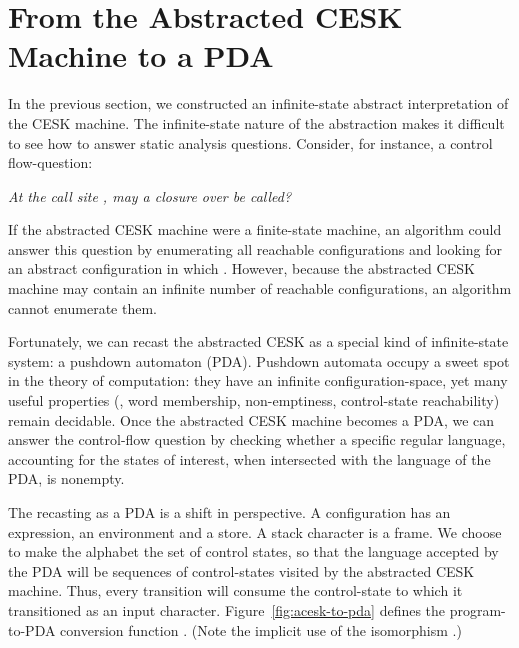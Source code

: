 \section{From the Abstracted CESK Machine
  to a PDA}
\label{sec:pda}
In the previous section, we constructed an infinite-state abstract
interpretation of the CESK machine.
The infinite-state nature of the abstraction makes it difficult to see how
to answer static analysis questions.
Consider, for instance, a control flow-question:
\begin{center}
\emph{  At the call site , may a closure over
   be called?}
\end{center}
If the abstracted CESK machine were a finite-state machine, an
algorithm could answer this question by enumerating all reachable
configurations and looking for an abstract configuration
 in which
.
However, because the abstracted CESK machine may contain an infinite
number of reachable configurations, an algorithm cannot enumerate
them.


Fortunately, we can recast the abstracted CESK as a special kind of
infinite-state system: a pushdown automaton (PDA).
Pushdown automata occupy a sweet spot in the theory of computation:
they have an infinite configuration-space, yet many useful properties
(\eg, word membership, non-emptiness, control-state reachability)
remain decidable.
Once the abstracted CESK machine becomes a PDA, we can answer the
control-flow question by checking whether a specific regular language,
accounting for the states of interest, when intersected with the
language of the PDA, is nonempty.

The recasting as a PDA is a shift in perspective.
A configuration has an expression, an environment and a store. 
A stack character is a frame.
We choose to make the alphabet the set of control states, so that the
language accepted by the PDA will be sequences of control-states
visited by the abstracted CESK machine.
Thus, every transition will consume the control-state to which it
transitioned as an input character.
Figure~\ref{fig:acesk-to-pda} defines the program-to-PDA conversion
function .  (Note the implicit
use of the isomorphism .)


